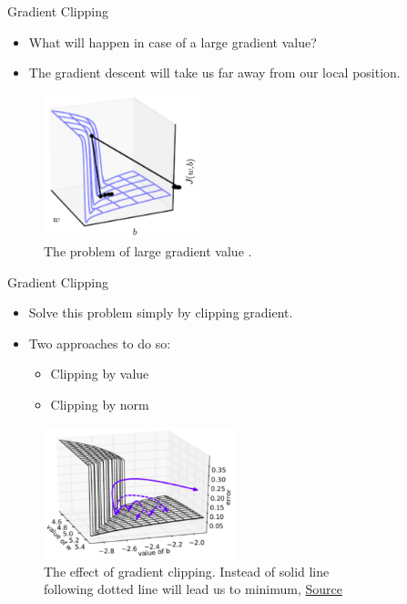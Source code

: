 \documentclass[compress,oilve,t]{beamer}
\newcommand{\tc}[2]{
	\textcolor{#1}{\hspace{-2pt}#2\hspace{-2pt}}
}
\begin{document}
\begin{frame}{Gradient Clipping}
	\begin{itemize}
		\item What will happen in case of a large gradient value?
		\item The gradient descent will take us \tc{keywords}{far away} from our local position.
	\end{itemize}
	\begin{figure}[H]
		\centering
		\includegraphics[width=0.4\textwidth]{Figs/gard-clipping-1.png}
		\caption{The problem of large gradient value \cite{Goodfellow-et-al-2016}.}
	\end{figure}
\end{frame}

\begin{frame}{Gradient Clipping}
	\begin{itemize}
		\item Solve this problem simply by clipping gradient.
		\item Two approaches to do so:
		\begin{itemize}
			\item Clipping by value
			\item Clipping by norm
		\end{itemize} 
	\end{itemize}
	\begin{figure}[H]
		\centering
		\includegraphics[width=0.5\textwidth]{Figs/clipping_more.png}
		\caption{The effect of gradient clipping. Instead of solid line\\following dotted line will lead us to minimum, \href{https://neptune.ai/blog/understanding-gradient-clipping-and-how-it-can-fix-exploding-gradients-problem}{Source}}
	\end{figure}
\end{frame}
\end{document}
